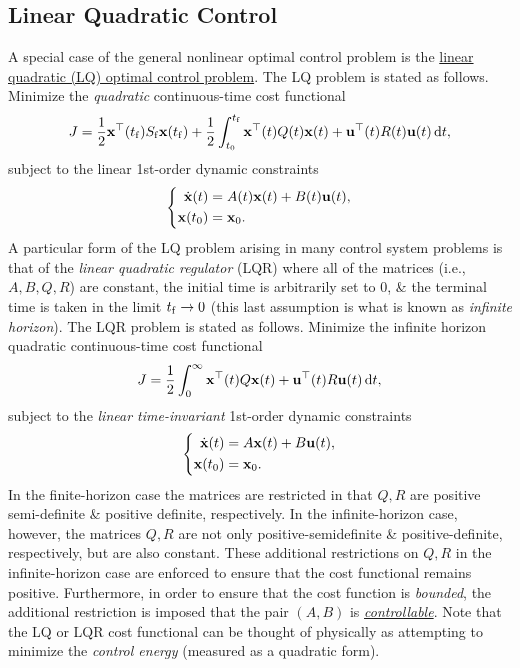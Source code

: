 \documentclass{article}
\begin{document}
\subsection{Linear Quadratic Control}
A special case of the general nonlinear optimal control problem is the \href{https://en.wikipedia.org/wiki/Linear-quadratic_regulator}{linear quadratic (LQ) optimal control problem}. The LQ problem is stated as follows. Minimize the {\it quadratic} continuous-time cost functional
\begin{equation}
	J = \frac{1}{2}{\bf x}^\top(t_{\rm f})S_{\rm f}{\bf x}(t_{\rm f}) + \frac{1}{2}\int_{t_0}^{t_{\rm f}} {\bf x}^\top(t)Q(t){\bf x}(t) + {\bf u}^\top(t)R(t){\bf u}(t)\,{\rm d}t,
\end{equation}
subject to the linear 1st-order dynamic constraints
\begin{equation}
	\left\{\begin{split}
		\dot{\bf x}(t) &= A(t){\bf x}(t) + B(t){\bf u}(t),\\
		{\bf x}(t_0) &= {\bf x}_0.
	\end{split}\right.	
\end{equation}
A particular form of the LQ problem arising in many control system problems is that of the {\it linear quadratic regulator} (LQR) where all of the matrices (i.e., $A,B,Q,R$) are constant, the initial time is arbitrarily set to 0, \& the terminal time is taken in the limit $t_{\rm f}\to0$ (this last assumption is what is known as {\it infinite horizon}). The LQR problem is stated as follows. Minimize the infinite horizon quadratic continuous-time cost functional
\begin{equation}
	J = \frac{1}{2}\int_0^\infty {\bf x}^\top(t)Q{\bf x}(t) + {\bf u}^\top(t)R{\bf u}(t)\,{\rm d}t,
\end{equation}
subject to the {\it linear time-invariant} 1st-order dynamic constraints
\begin{equation}
	\left\{\begin{split}
		\dot{\bf x}(t) &= A{\bf x}(t) + B{\bf u}(t),\\
		{\bf x}(t_0) &= {\bf x}_0.
	\end{split}\right.
\end{equation}
In the finite-horizon case the matrices are restricted in that $Q,R$ are positive semi-definite \& positive definite, respectively. In the infinite-horizon case, however, the matrices $Q,R$ are not only positive-semidefinite \& positive-definite, respectively, but are also constant. These additional restrictions on $Q,R$ in the infinite-horizon case are enforced to ensure that the cost functional remains positive. Furthermore, in order to ensure that the cost function is {\it bounded}, the additional restriction is imposed that the pair $(A,B)$ is \href{https://en.wikipedia.org/wiki/Controllability}{\it controllable}. Note that the LQ or LQR cost functional can be thought of physically as attempting to minimize the {\it control energy} (measured as a quadratic form).
\end{document}
